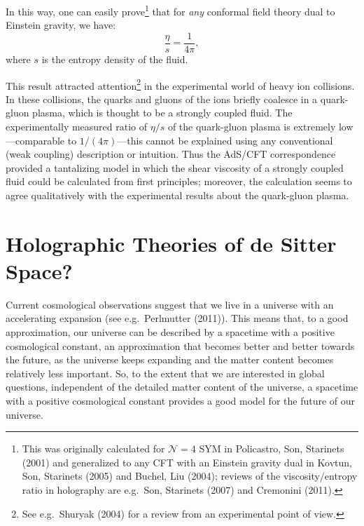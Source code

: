 \documentclass[12pt]{article}
\def\be{\begin{equation}}
\def\ee{\end{equation}}
\renewcommand{\^}[1]{\hat{#1}}
\begin{document}
In this way, one can easily prove\footnote{This was originally calculated for $\mathcal{N}=4$ SYM in Policastro, Son, Starinets (2001) and generalized to any CFT with an Einstein gravity dual in Kovtun, Son, Starinets (2005) and Buchel, Liu (2004); reviews of the viscosity/entropy ratio in holography are e.g.~Son, Starinets (2007) and Cremonini (2011).}
that for {\em any} 
conformal field theory dual
to Einstein gravity,
 we have:
\be \label{RHIC} \frac{\eta}{s} = \frac{1}{4\pi},\ee
where $s$ is the entropy density of the fluid. 

This result attracted attention\footnote{See e.g.~Shuryak (2004) for a review from an experimental point of view.} in the experimental world of heavy ion collisions. In these collisions, the quarks and gluons of the ions briefly coalesce in a quark-gluon plasma, which is thought to be a strongly coupled fluid. The experimentally measured ratio of $\eta/s$ of the quark-gluon plasma is extremely low---comparable to $1/(4\pi)$---this cannot be explained using any conventional (weak coupling) description or intuition. Thus the AdS/CFT correspondence provided a tantalizing model in which the shear viscosity of a strongly coupled fluid could be calculated from first principles; moreover, the calculation seems to agree qualitatively with the experimental results about the quark-gluon plasma.


\section{Holographic Theories of de Sitter Space?}\label{dS?}

Current cosmological observations suggest that we live in a universe with an accelerating expansion (see e.g.~Perlmutter (2011)). This means that, to a good approximation, our universe can be described by a spacetime with a positive cosmological constant, an approximation that becomes better and better towards the future, as the universe keeps expanding and the matter content becomes relatively less important. So, to the extent that we are interested in global questions, independent of the detailed matter content of the universe, a spacetime with a positive cosmological constant provides a good model for the future of our universe. 
\end{document}
